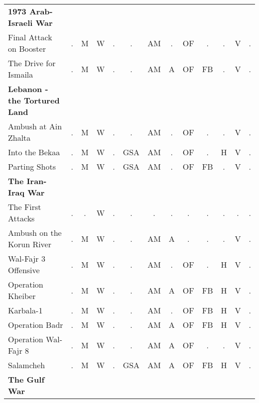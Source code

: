 \documentclass[a4paper]{article}
\newenvironment{texte}{\rmfamily\footnotesize}{}
\begin{document}
\begin{texte}
\begin{tabular}{lcccccccccccc}
\bf 1973 Arab-Israeli War \\

     Final Attack on Booster                       & . &  M &  W &  . &  .  & AM & . & OF &  . & . &  V & . \\
     The Drive for Ismaila                         & . &  M &  W &  . &  .  & AM & A & OF & FB & . &  V & . \\

\bf Lebanon - the Tortured Land \\

     Ambush at Ain Zhalta                          & . &  M &  W &  . &  .  & AM & . & OF &  . & . &  V & . \\
     Into the Bekaa                                & . &  M &  W &  . & GSA & AM & . & OF &  . & H &  V & . \\
     Parting Shots                                 & . &  M &  W &  . & GSA & AM & . & OF & FB & . &  V & . \\

\bf The Iran-Iraq War \\

     The First Attacks                             & . &  . &  W &  . &  .  &  . & . &  . &  . & . &  . & . \\
     Ambush on the Korun River                     & . &  M &  W &  . &  .  & AM & A &  . &  . & . &  V & . \\
     Wal-Fajr 3 Offensive                          & . &  M &  W &  . &  .  & AM & . & OF &  . & H &  V & . \\
     Operation Kheiber                             & . &  M &  W &  . &  .  & AM & A & OF & FB & H &  V & . \\
     Karbala-1                                     & . &  M &  W &  . &  .  & AM & . & OF & FB & H &  V & . \\
     Operation Badr                                & . &  M &  W &  . &  .  & AM & A & OF & FB & H &  V & . \\
     Operation Wal-Fajr 8                          & . &  M &  W &  . &  .  & AM & A & OF &  . & . &  V & . \\
     Salamcheh                                     & . &  M &  W &  . & GSA & AM & A & OF & FB & H &  V & . \\

\bf The Gulf War \\


\end{tabular}
\end{texte}
\end{document}
